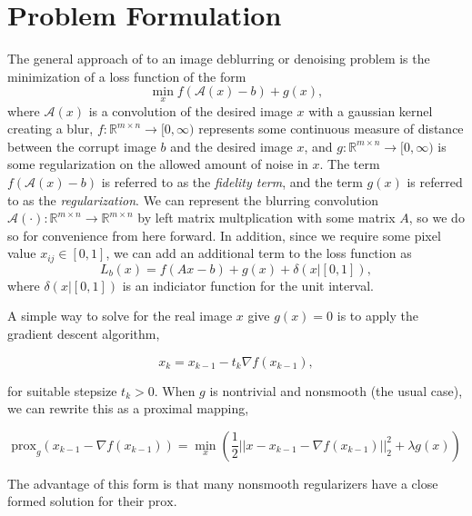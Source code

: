 \documentclass[10pt,a4paper]{article}
\newcommand{\prox}{\mathrm{prox}}
\newcommand{\R}{\mathbb{R}}
\begin{document}
\section{Problem Formulation}
The general approach of to an image deblurring or denoising problem is the minimization of a loss function of the form \cite{DeblurBook}
\begin{equation} \label{general}
 \min_x f(\mathcal{A}(x) -b) + g(x),
\end{equation}
where $\mathcal{A}(x)$ is a convolution of the desired image $x$ with a gaussian kernel creating a blur,  $f : \R^{m \times n} \rightarrow [0, \infty)$ represents some continuous measure of distance between the corrupt image $b$ and the desired image $x$, and $g:\R^{m \times n} \rightarrow [0,\infty)$ is some regularization on the allowed amount of noise in $x$. The term $f(\mathcal{A}(x)-b)$ is referred to as the \emph{fidelity term}, and the term $g(x)$ is referred to as the \emph{regularization}. We can represent the blurring convolution $\mathcal{A}(\cdot): \R^{m \times n} \rightarrow \R^{m \times n}$ by left matrix multplication with some matrix $A$, so we do so for convenience from here forward. In addition, since we require some pixel value $x_{ij} \in [0,1]$, we can add an additional term to the loss function as
\begin{equation} \label{loss}
 L_b(x) = f(Ax-b) + g(x) + \delta(x | [0,1] ),
\end{equation}
where $\delta(x | [0,1])$ is an indiciator function for the unit interval. 

A simple way to solve for the real image $x$ give $g(x) = 0$ is to apply the gradient descent algorithm,

\begin{equation}
x_k = x_{k-1} - t_k \nabla f(x_{k-1}),
\end{equation}

for suitable stepsize $t_k > 0$. When $g$ is nontrivial and nonsmooth (the usual case), we can rewrite this as a proximal mapping,

\begin{equation}
\prox_g(x_{k-1} - \nabla f(x_{k-1})) = \min_x \left( \frac{1}{2}||x-x_{k-1} - \nabla f(x_{k-1})||_2^2  + \lambda g(x)\right)
\end{equation}

The advantage of this form is that many nonsmooth regularizers have a close formed solution for their $\prox$.

\end{document}
